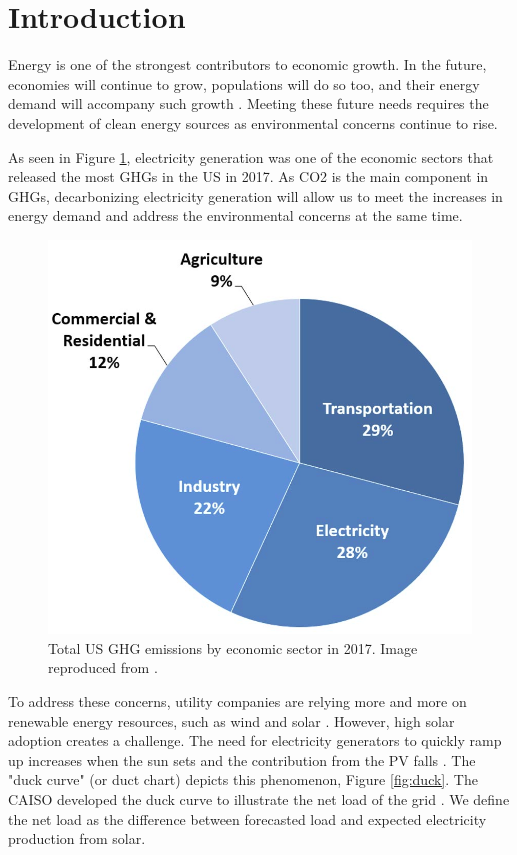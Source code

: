 \documentclass[11pt,letterpaper]{article}
\begin{document}

\section{Introduction}

Energy is one of the strongest contributors to economic growth.
In the future, economies will continue to grow, populations will do so too, and their energy demand will accompany such growth \cite{burke_impact_2018} \cite{el-shafie_hydrogen_2019}.
Meeting these future needs requires the development of clean energy sources as environmental concerns continue to rise.

As seen in Figure \ref{fig:ghg}, electricity generation was one of the economic sectors that released the most \glspl{GHG} in the \gls{US} in 2017.
As \gls{CO2} is the main component in \glspl{GHG}, decarbonizing electricity generation will allow us to meet the increases in energy demand and address the environmental concerns at the same time.

\begin{figure}[htbp!]
	\centering
	\includegraphics[width=0.4\linewidth]{figures/total-ghg-2017.png}
	\hfill
	\caption{Total \gls{US} \gls{GHG} emissions by economic sector in 2017. Image reproduced from \cite{us_epa_sources_2020}.}
	\label{fig:ghg}
\end{figure}

To address these concerns, utility companies are relying more and more on renewable energy resources, such as wind and solar \cite{ming_resource_2019}.
However, high solar adoption creates a challenge.
The need for electricity generators to quickly ramp up increases when the sun sets and the contribution from the \gls{PV} falls \cite{us_department_of_energy_confronting_2017}.
The "duck curve" (or duct chart) depicts this phenomenon, Figure \ref{fig:duck}.
The \gls{CAISO} developed the duck curve to illustrate the net load of the grid \cite{bouillon_prepared_2014}.
We define the net load as the difference between forecasted load and expected electricity production from solar.
\end{document}
